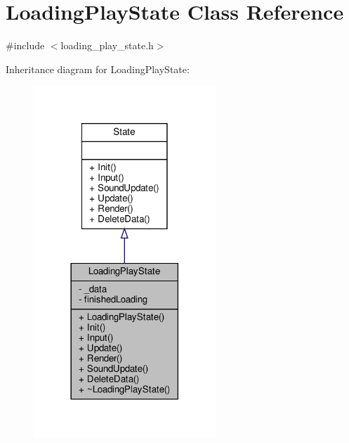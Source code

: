 \hypertarget{classLoadingPlayState}{}\section{Loading\+Play\+State Class Reference}
\label{classLoadingPlayState}


{\ttfamily \#include $<$loading\+\_\+play\+\_\+state.\+h$>$}



Inheritance diagram for Loading\+Play\+State\+:
\nopagebreak
\begin{figure}[H]
\begin{center}
\leavevmode
\includegraphics[width=194pt]{classLoadingPlayState__inherit__graph}
\end{center}
\end{figure}


